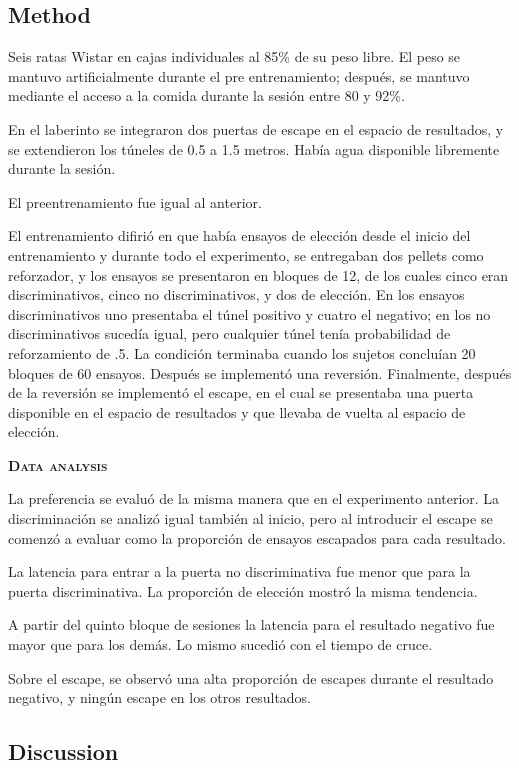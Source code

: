 \documentclass[a4paper,12pt]{article}
\begin{document}
\subsection{Method}

Seis ratas Wistar en cajas individuales al 85\% de su peso libre.
El peso se mantuvo artificialmente durante el pre entrenamiento; después, se mantuvo mediante el acceso a la comida durante la sesión entre 80 y 92\%.

En el laberinto se integraron dos puertas de escape en el espacio de resultados, y se extendieron los túneles de 0.5 a 1.5 metros.
Había agua disponible libremente durante la sesión.

El preentrenamiento fue igual al anterior.

El entrenamiento difirió en que había ensayos de elección desde el inicio del entrenamiento y durante todo el experimento, se entregaban dos pellets como reforzador, y los ensayos se presentaron en bloques de 12, de los cuales cinco eran discriminativos, cinco no discriminativos, y dos de elección.
En los ensayos discriminativos uno presentaba el túnel positivo y cuatro el negativo; en los no discriminativos sucedía igual, pero cualquier túnel tenía probabilidad de reforzamiento de .5.
La condición terminaba cuando los sujetos concluían 20 bloques de 60 ensayos.
Después se implementó una reversión.
Finalmente, después de la reversión se implementó el escape, en el cual se presentaba una puerta disponible en el espacio de resultados y que llevaba de vuelta al espacio de elección.

{\noindent\scshape\bfseries Data analysis}

La preferencia se evaluó de la misma manera que en el experimento anterior.
La discriminación se analizó igual también al inicio, pero al introducir el escape se comenzó a evaluar como la proporción de ensayos escapados para cada resultado.

La latencia para entrar a la puerta no discriminativa fue menor que para la puerta discriminativa.
La proporción de elección mostró la misma tendencia.

A partir del quinto bloque de sesiones la latencia para el resultado negativo fue mayor que para los demás.
Lo mismo sucedió con el tiempo de cruce.

Sobre el escape, se observó una alta proporción de escapes durante el resultado negativo, y ningún escape en los otros resultados.

\subsection{Discussion}
\end{document}
